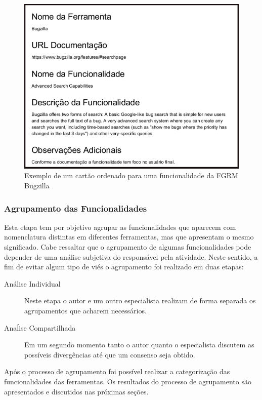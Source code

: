 \begin{figure}[htpb]
	\centering
	\includegraphics[width=0.8\linewidth]{./chapter-estudo-funcionalidades-fgrm/img/exemplo_cartao_ordenado.png}
	\caption{Exemplo de um cartão ordenado para uma funcionalidade da FGRM
		Bugzilla}
	\label{fig:exemplo_cartao_ordenado}
\end{figure}
\todoend

\subsubsection{Agrupamento das Funcionalidades}
\label{subsec:agrupamento_fucionalidades}

Esta etapa tem por objetivo agrupar as funcionalidades que aparecem com
nomenclatura distintas em diferentes ferramentas, mas que apresentam o mesmo
significado. Cabe ressaltar que o agrupamento de algumas funcionalidades pode
depender de uma análise subjetiva do responsável pela atividade. Neste sentido,
a fim de evitar algum tipo de viés o agrupamento foi realizado em duas etapas:

\begin{description}
	\item[Análise Individual] Neste etapa o autor e um outro especialista
		realizam de forma separada os agrupamentos que acharem necessários.
	\item[Anaĺise Compartilhada] Em um segundo momento tanto o autor quanto o
		es\-pe\-ci\-a\-lis\-ta discutem as possíveis divergências até que um
		consenso seja obtido.
\end{description}

Após o processo de agrupamento foi possível realizar a categorização das
funcionalidades das ferramentas. Os resultados do processo de agrupamento são
apresentados e discutidos nas próximas seções.

